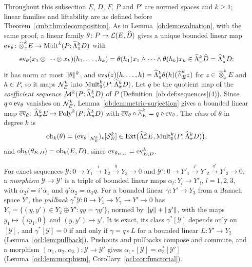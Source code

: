 Throughout this subsection $E$, $D$, $F$, $P$ and $P'$ are normed spaces and $k\ge1$; linear families and liftability
are as defined before Theorem~\ref{cmb:thm:decomposition}. As in Lemma~\ref{ob:lem:evaluation}, with the same proof, a
linear family $\theta\colon P\to\mathcal L(E,\widehat D)$ gives a unique bounded linear map
$\operatorname{ev}_\theta\colon\widehat\otimes^k_\pi E\to\operatorname{Mult}^k(P;\widehat\Lambda^k_\pi D)$ with
\[
 \operatorname{ev}_\theta(x_1\otimes\dots\otimes x_k)(h_1,\dots,h_k)=\theta(h_1)x_1\wedge\dots\wedge\theta(h_k)x_k
 \in\widehat\Lambda^k_\pi\widehat D=\widehat\Lambda^k_\pi D;
\]
it has norm at most $\lVert \theta\rVert^k$, and
$\operatorname{ev}_\theta(z)(h,\dots,h)=\widehat\Lambda^k_\pi\theta(h)(\widehat\wedge^k_Ez)$ for $z\in\widehat\otimes^k_\pi E$ and $h\in P$,
so it maps $\mathcal N^k_E$ into $\operatorname{Mult}^k_0(P;\widehat\Lambda^k_\pi D)$. Let $q$ be the quotient map of the \emph{coefficient
sequence} $\mathcal M^k(P;\widehat\Lambda^k_\pi D)$ of $P$ (Definition~\ref{ob:def:sequences}(4)). Since $q\circ\operatorname{ev}_\theta$
vanishes on $\mathcal N^k_E$, Lemma~\ref{ob:lem:metric-surjection} gives a bounded linear map
$\overline{\operatorname{ev}}_\theta\colon\widehat\Lambda^k_\pi E\to\operatorname{Poly}^k(P;\widehat\Lambda^k_\pi D)$ with
$\overline{\operatorname{ev}}_\theta\circ\widehat\wedge^k_E=q\circ\operatorname{ev}_\theta$. The \emph{class} of $\theta$ in degree $k$ is
\begin{equation}\label{cmb:eq:family-class}
 \operatorname{ob}_k(\theta)=(\operatorname{ev}_\theta|_{\mathcal N^k_E})_*[\mathcal S^k_E]\in\operatorname{Ext}\bigl(\widehat\Lambda^k_\pi E,\operatorname{Mult}^k_0(P;\widehat\Lambda^k_\pi D)\bigr),
\end{equation}
and $\operatorname{ob}_k(\theta_{E,D})=\operatorname{ob}_k(E,D)$, since $\operatorname{ev}_{\theta_{E,D}}=\operatorname{ev}^k_{E,D}$.

For exact sequences $\mathcal Y\colon0\to Y_1\xrightarrow iY_2\xrightarrow qY_3\to0$ and
$\mathcal Y'\colon0\to Y'_1\xrightarrow{i'}Y'_2\xrightarrow{q'}Y'_3\to0$, a \emph{morphism} $\mathcal Y\to\mathcal Y'$ is a
triple of bounded linear maps $\alpha_l\colon Y_l\to Y'_l$, $l=1,2,3$, with $\alpha_2i=i'\alpha_1$ and
$q'\alpha_2=\alpha_3q$. For a bounded linear $\gamma\colon Y'\to Y_3$ from a Banach space $Y'$, the \emph{pullback}
$\gamma^*\mathcal Y\colon0\to Y_1\to Y_\gamma\to Y'\to0$ has $Y_\gamma=\{(y,y')\in Y_2\oplus Y':qy=\gamma y'\}$, normed by
$\lVert y\rVert+\lVert y'\rVert$, with the maps $y_1\mapsto(iy_1,0)$ and $(y,y')\mapsto y'$. It is exact, its class
$\gamma^*[\mathcal Y]$ depends only on $[\mathcal Y]$, and $\gamma^*[\mathcal Y]=0$ if and only if $\gamma=q\circ L$
for a bounded linear $L\colon Y'\to Y_2$ (Lemma~\ref{ocl:lem:pullback}). Pushouts and pullbacks compose and commute, and a morphism
$(\alpha_1,\alpha_2,\alpha_3)\colon\mathcal Y\to\mathcal Y'$ gives $\alpha_{1*}[\mathcal Y]=\alpha_3^*[\mathcal Y']$
(Lemma~\ref{ocl:lem:morphism}, Corollary~\ref{ocl:cor:functorial}).

